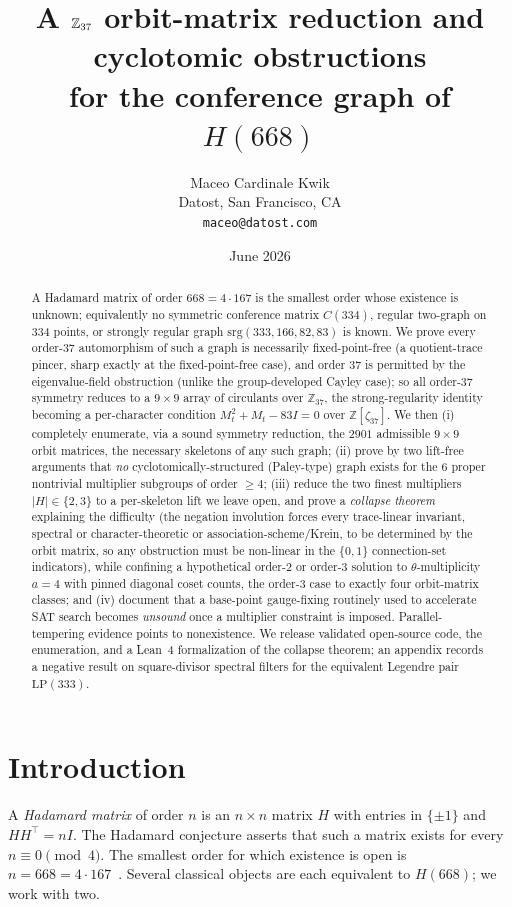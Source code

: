 \documentclass[11pt]{article}
\title{A $\Z_{37}$ orbit-matrix reduction and cyclotomic obstructions\\ for the conference graph of $H(668)$}
\author{Maceo Cardinale Kwik\\[2pt] \small Datost, San Francisco, CA\\ \small \texttt{maceo@datost.com}}
\date{June 2026}
\theoremstyle{definition}
\newcommand{\Z}{\mathbb{Z}}
\begin{document}
\maketitle

\begin{abstract}
A Hadamard matrix of order $668 = 4\cdot 167$ is the smallest order whose existence is unknown; equivalently
no symmetric conference matrix $C(334)$, regular two-graph on $334$ points, or strongly regular graph
$\mathrm{srg}(333,166,82,83)$ is known. We prove every order-$37$ automorphism of such a graph is
necessarily fixed-point-free (a quotient-trace pincer, sharp exactly at the fixed-point-free case), and
order $37$ is permitted by the eigenvalue-field obstruction (unlike the group-developed Cayley case); so
all order-$37$ symmetry reduces to a $9\times9$ array of circulants over $\Z_{37}$, the strong-regularity
identity becoming a per-character condition $M_t^2+M_t-83I=0$ over $\Z[\zeta_{37}]$. We then (i) completely
enumerate, via a sound symmetry reduction, the $2901$ admissible $9\times9$ orbit matrices, the necessary
skeletons of any such graph; (ii) prove by two lift-free arguments that \emph{no} cyclotomically-structured
(Paley-type) graph exists for the $6$ proper nontrivial multiplier subgroups of order $\ge 4$; (iii) reduce
the two finest multipliers $|H|\in\{2,3\}$ to a per-skeleton lift we leave open, and prove a
\emph{collapse theorem} explaining the difficulty (the negation involution forces every trace-linear
invariant, spectral or character-theoretic or association-scheme/Krein, to be determined by the orbit
matrix, so any obstruction must be non-linear in the $\{0,1\}$ connection-set indicators), while confining a
hypothetical order-$2$ or order-$3$ solution to $\theta$-multiplicity $a=4$ with pinned diagonal coset
counts, the order-$3$ case to exactly four orbit-matrix classes; and (iv) document that a base-point
gauge-fixing routinely used to accelerate SAT search becomes \emph{unsound} once a multiplier constraint is
imposed. Parallel-tempering evidence points to nonexistence. We release validated open-source code, the
enumeration, and a Lean~4 formalization of the collapse theorem; an appendix records a negative result on
square-divisor spectral filters for the equivalent Legendre pair $\mathrm{LP}(333)$.
\end{abstract}

\section{Introduction}
A \emph{Hadamard matrix} of order $n$ is an $n\times n$ matrix $H$ with entries in $\{\pm1\}$ and
$HH^\top = nI$. The Hadamard conjecture asserts that such a matrix exists for every $n\equiv 0\pmod 4$.
The smallest order for which existence is open is $n=668=4\cdot 167$~\cite{cati,brouwer}. Several
classical objects are each equivalent to $H(668)$; we work with two.
\end{document}
